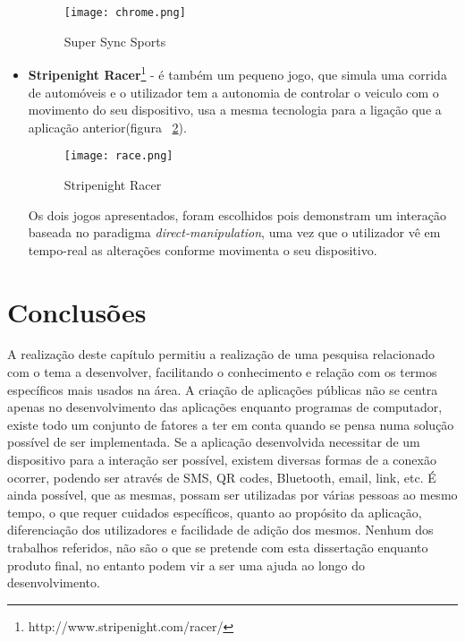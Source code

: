 \begin{itemize}
\begin{figure}[ht]
\centering
\texttt{[image: chrome.png]}
\caption {Super Sync Sports}
\label{fig:chrome}
\end{figure}

\item \textbf{Stripenight Racer}\footnote{http://www.stripenight.com/racer/} - é também um pequeno jogo, que simula uma corrida de automóveis e o utilizador tem a autonomia de controlar o veiculo com o movimento do seu dispositivo, usa a mesma tecnologia para a ligação que a aplicação anterior(figura ~\ref{fig:racer}).

\begin{figure}[ht]
\centering
\texttt{[image: race.png]}
\caption {Stripenight Racer}
\label{fig:racer}
\end{figure}

Os dois jogos apresentados, foram escolhidos pois demonstram um interação baseada no paradigma \textit{direct-manipulation}, uma vez que o utilizador vê em tempo-real as alterações conforme movimenta o seu dispositivo.


\end{itemize}

\section{Conclusões}

A realização deste capítulo permitiu a realização de uma pesquisa relacionado com o tema a desenvolver, facilitando o conhecimento e relação com os termos específicos mais usados na área.
A criação de aplicações públicas não se centra apenas no desenvolvimento das aplicações enquanto programas de computador, existe todo um conjunto de fatores a ter em conta quando se pensa numa solução possível de ser implementada.
Se a aplicação desenvolvida necessitar de um dispositivo para a interação ser possível, existem diversas formas de a conexão ocorrer, podendo ser através de SMS, QR codes, Bluetooth, email, link, etc.
É ainda possível, que as mesmas, possam ser utilizadas por várias pessoas ao mesmo tempo, o que requer cuidados específicos, quanto ao propósito da aplicação, diferenciação dos utilizadores e facilidade de adição dos mesmos.
Nenhum dos trabalhos referidos, não são o que se pretende com esta dissertação enquanto produto final, no entanto podem vir a ser uma ajuda ao longo do desenvolvimento.


	
